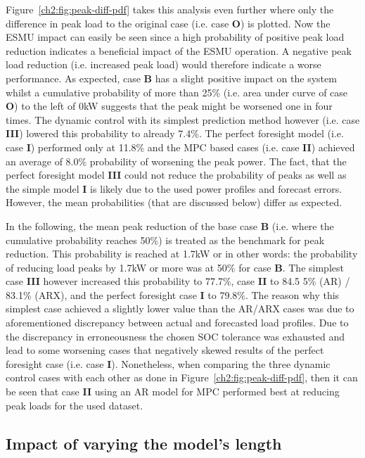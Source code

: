 

Figure~\ref{ch2:fig:peak-diff-pdf} takes this analysis even further where only the difference in peak load to the original case (i.e. case \textbf{O}) is plotted.
Now the ESMU impact can easily be seen since a high probability of positive peak load reduction indicates a beneficial impact of the ESMU operation.
A negative peak load reduction (i.e. increased peak load) would therefore indicate a worse performance.
As expected, case \textbf{B} has a slight positive impact on the system whilst a cumulative probability of more than 25\% (i.e. area under curve of case \textbf{O}) to the left of 0kW suggests that the peak might be worsened one in four times.
The dynamic control with its simplest prediction method however (i.e. case \textbf{III}) lowered this probability to already 7.4\%.
The perfect foresight model (i.e. case \textbf{I}) performed only at 11.8\% and the MPC based cases (i.e. case \textbf{II}) achieved an average of 8.0\% probability of worsening the peak power.
The fact, that the perfect foresight model \textbf{III} could not reduce the probability of peaks as well as the simple model \textbf{I} is likely due to the used power profiles and forecast errors.
However, the mean probabilities (that are discussed below) differ as expected.

In the following, the mean peak reduction of the base case \textbf{B} (i.e. where the cumulative probability reaches 50\%) is treated as the benchmark for peak reduction.
This probability is reached at 1.7kW or in other words: the probability of reducing load peaks by 1.7kW or more was at 50\% for case \textbf{B}.
The simplest case \textbf{III} however increased this probability to 77.7\%, case \textbf{II} to 84.5 5\% (AR) / 83.1\% (ARX), and the perfect foresight case \textbf{I} to 79.8\%.
The reason why this simplest case achieved a slightly lower value than the AR/ARX cases was due to aforementioned discrepancy between actual and forecasted load profiles.
Due to the discrepancy in erroneousness the chosen SOC tolerance was exhausted and lead to some worsening cases that negatively skewed results of the perfect foresight case (i.e. case \textbf{I}).
Nonetheless, when comparing the three dynamic control cases with each other as done in Figure~\ref{ch2:fig:peak-diff-pdf}, then it can be seen that case \textbf{II} using an AR model for MPC performed best at reducing peak loads for the used dataset.

\subsection{Impact of varying the model's length}

